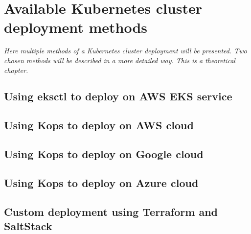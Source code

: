 \section{Available Kubernetes cluster deployment methods}
\textit{Here multiple methods of a Kubernetes cluster deployment will be presented. Two chosen methods will be described in a more detailed way. This is a theoretical chapter.}

\subsection{Using eksctl to deploy on AWS EKS service}
\subsection{Using Kops to deploy on AWS cloud}
\subsection{Using Kops to deploy on Google cloud}
\subsection{Using Kops to deploy on Azure cloud}
\subsection{Custom deployment using Terraform and SaltStack}
